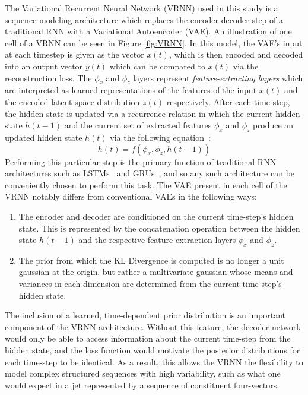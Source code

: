 \documentclass[12pt, a4paper]{article}
\begin{document}
The Variational Recurrent Neural Network (VRNN) used in this study is a sequence modeling architecture
which replaces the encoder-decoder step of a traditional RNN with a Variational
Autoencoder (VAE). An illustration of one cell of a VRNN can be seen
in Figure \ref{fig:VRNN}. 
In this model, the VAE's input at each timestep is given as the vector $x(t)$, which is then encoded and decoded into an output vector $y(t)$ which can be compared to $x(t)$ via the reconstruction loss.
The $\phi_{x}$ and $\phi_{z}$ layers represent \textit{feature-extracting layers} which are interpreted as learned representations of the features of the input $x(t)$ and the encoded latent space distribution $z(t)$ respectively. After each time-step, the hidden state is updated via a recurrence relation in which the current hidden state $h(t-1)$ and the current set of extracted features $\phi_{x}$ and $\phi_{z}$ produce an updated hidden state $h(t)$ via the following equation~\cite{chung2016recurrent}:
\begin{equation}
	h(t) = f(\phi_{x}, \phi_{z}, h(t-1))
\end{equation} 
Performing this particular step is the primary function of traditional RNN architectures such as LSTMs~\cite{lstm} and GRUs~\cite{cho2014learning}, and so any such architecture can be conveniently chosen to perform this task.
The VAE present in each cell of the VRNN notably differs from
conventional VAEs in the following ways:
\begin{enumerate}
  \item{The encoder and decoder are conditioned on the current time-step's hidden state.
  This is represented by the concatenation operation between the hidden state $h(t-1)$ and the respective feature-extraction layers $\phi_{x}$ and $\phi_{z}$.}
  \item{The prior from which the KL Divergence is computed is no longer a unit gaussian
  at the origin, but rather a multivariate gaussian whose means and variances in each 
  dimension are determined from the current time-step's hidden state.}
\end{enumerate}


The inclusion of a learned, time-dependent prior distribution is an important component of the VRNN architecture. Without this feature, the decoder network would only be able to access information about the current time-step from the hidden state, and the loss function would motivate the posterior distributions for each time-step to be identical. As a result, this allows the VRNN the flexibility to model complex structured sequences with high variability, such as what one would expect in a jet represented by a sequence of constituent four-vectors.
\end{document}
